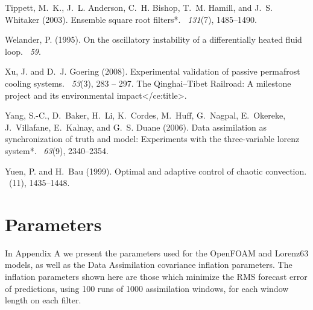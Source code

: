 \documentclass[12pt]{report}
\begin{document}
\begin{thebibliography}{}
Tippett, M.~K., J.~L. Anderson, C.~H. Bishop, T.~M. Hamill, and J.~S. Whitaker
  (2003).
\newblock Ensemble square root filters*.
~{\em 131\/}(7), 1485--1490.

Welander, P. (1995).
\newblock On the oscillatory instability of a differentially heated fluid loop.
~{\em 59}.

Xu, J. and D.~J. Goering (2008).
\newblock Experimental validation of passive permafrost cooling systems.
~{\em 53\/}(3), 283 --
  297.
The Qinghai–Tibet Railroad: A milestone project and its
  environmental impact</ce:title>.

Yang, S.-C., D.~Baker, H.~Li, K.~Cordes, M.~Huff, G.~Nagpal, E.~Okereke,
  J.~Villafane, E.~Kalnay, and G.~S. Duane (2006).
\newblock Data assimilation as synchronization of truth and model: Experiments
  with the three-variable lorenz system*.
~{\em 63\/}(9),
  2340--2354.

Yuen, P. and H.~Bau (1999).
\newblock Optimal and adaptive control of chaotic convection.
~(11), 1435--1448.

\end{thebibliography}

\appendix
\addappheadtotoc

\titleformat{\chapter}[hang]{\normalfont\huge\bfseries}{\chaptertitlename\ \thechapter:}{1em}{} 

\chapter{Parameters}
\label{params}

In Appendix A we present the parameters used for the OpenFOAM and Lorenz63 models, as well as the Data Assimilation covariance inflation parameters.
The inflation parameters shown here are those which minimize the RMS forecast error of predictions, using 100 runs of 1000 assimilation windows, for each window length on each filter.
\end{document}
